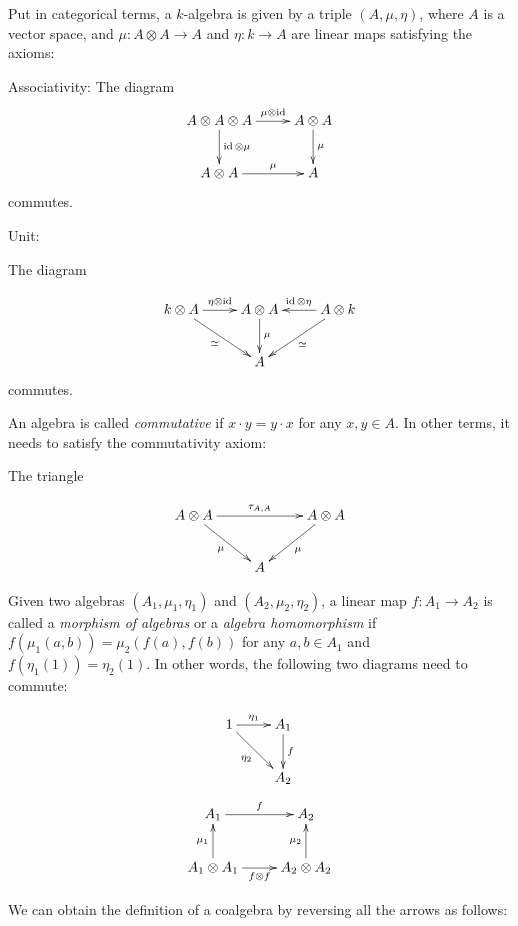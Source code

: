 Put in categorical terms, a $k$-algebra is given by a triple $(A, \mu, \eta)$,
where $A$ is a vector space, and $\mu: A \otimes A \to A$ and $\eta: k \to A$
are linear maps satisfying the axioms:

Associativity:
The diagram
\begin{equation}
\xymatrix{
A \otimes A \otimes A \ar[d]^-{\id \otimes \mu} \ar[r]^-{\mu \otimes \id} & A \otimes A \ar[d]^-{\mu}\\
 A \otimes A \ar[r]^-\mu & A 
}
\end{equation}
commutes.

Unit: 

The diagram

\begin{equation}
    \xymatrix{
    k \otimes A \ar[r]^-{\eta \otimes \id} \ar[rd]_\simeq & A \otimes A \ar[d]^-\mu & A \otimes k \ar[l]_{\id \otimes \eta} \ar[ld]^-{\simeq} \\
    & A &
    }
\end{equation}
commutes.

An algebra is called \emph{commutative} if $x \cdot y = y \cdot x$ for any
$x,y\in A$. In other terms, it needs to satisfy the commutativity axiom:

The triangle 

\begin{equation}
    \xymatrix{
    A \otimes A \ar[rr]^-{\tau_{A,A}} \ar[rd]_\mu & & A \otimes A \ar[ld]^-\mu \\
    & A &
    }
\end{equation}

Given two algebras $(A_1, \mu_1, \eta_1)$ and $(A_2, \mu_2, \eta_2)$, a linear
map $f: A_1 \to A_2$ is called a \emph{morphism of algebras} or a
\emph{algebra homomorphism} if $f(\mu_1(a,b)) = \mu_2(f(a), f(b))$ for any
$a,b\in A_1$ and $f(\eta_1(1)) = \eta_2(1)$. In other words, the following two
diagrams need to commute:

\begin{equation}
    \xymatrix{
    1 \ar[r]^-{\eta_1} \ar[rd]_{\eta_2} & A_1 \ar[d]^-f \\
    & A_2
    }
\end{equation}
\begin{equation}
    \xymatrix{
    A_1 \ar[r]^-f & A_2 \\
    A_1 \otimes A_1 \ar[u]^-{\mu_1} \ar[r]_-{f\otimes f} & A_2 \otimes A_2 \ar[u]^-{\mu_2}
    }
\end{equation}


We can obtain the definition of a coalgebra by reversing all the arrows as follows:

